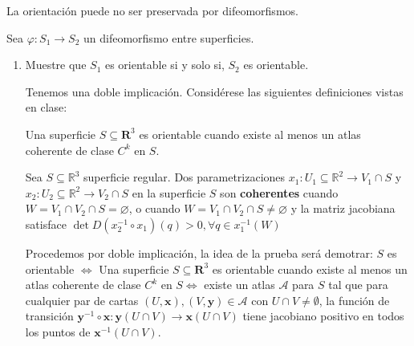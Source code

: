\begin{problema}
    La orientación puede no ser preservada por difeomorfismos.

Sea $\varphi: S_{1} \rightarrow S_{2}$ un difeomorfismo entre superficies.

\begin{enumerate}
    \item Muestre que $S_{1}$ es orientable si y solo si, $S_{2}$ es orientable.
    \begin{dem}
        Tenemos una doble implicación. Considérese las siguientes definiciones vistas en clase: 
        \begin{cajita}
            Una superficie $S\subseteq \mathbf{R}^3$ es orientable cuando existe al menos un atlas coherente de clase $C^k$ en $S$. 
        \end{cajita}
        \begin{cajita}
            Sea $S\subseteq \mathbb{R}^3$ superficie regular. Dos parametrizaciones $x_1:U_1\subseteq \mathbb{R}^2\to V_1\cap S$ y $x_2:U_2\subseteq \mathbb{R}^2\to V_2\cap S$ en la superficie $S$ son \textbf{coherentes} cuando $W=V_1\cap V_2\cap S=\varnothing$, o cuando $W=V_1\cap V_2\cap S\neq \varnothing$ y la matriz jacobiana satisface $\det D(x_2^{-1}\circ x_1)(q)>0,\forall q\in x_1^{-1}(W)$
        \end{cajita}

        Procedemos por doble implicación, la idea de la prueba será demotrar:  $S$ es orientable $\iff$  Una superficie $S\subseteq \mathbf{R}^3$ es orientable cuando existe al menos un atlas coherente de clase $C^k$ en $S\iff$ existe un atlas $\mathcal{A}$ para $S$ tal que para cualquier par de cartas $(U,\mathbf{x}),(V,\mathbf{y})\in\mathcal{A}$ con $U\cap V\neq\emptyset$, la función de transición $\mathbf{y}^{-1}\circ\mathbf{x}:\mathbf{y}(U\cap V)\to \mathbf{x}(U\cap V)$ tiene jacobiano positivo en todos los puntos de $\mathbf{x}^{-1}(U\cap V)$.

        
        

\end{dem}
\end{enumerate}
\end{problema}
